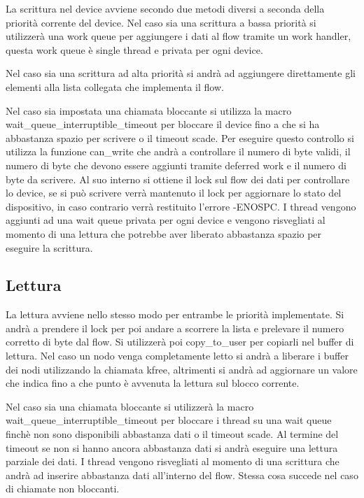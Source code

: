 \documentclass[a4paper,10pt]{article}
\begin{document}
La scrittura nel device avviene secondo due metodi diversi a seconda della priorità corrente del device.
Nel caso sia una scrittura a bassa priorità si utilizzerà una work queue per aggiungere i dati al flow tramite un work handler, questa work queue è single thread e privata per ogni device.

Nel caso sia una scrittura ad alta priorità si andrà ad aggiungere direttamente gli elementi alla lista collegata che implementa il flow.

Nel caso sia impostata una chiamata bloccante si utilizza la macro \\wait\_queue\_interruptible\_timeout per bloccare il device fino a che si ha abbastanza spazio per scrivere o il timeout scade. Per eseguire questo controllo si utilizza la funzione can\_write che andrà a controllare il numero di byte validi, il numero di byte che devono essere aggiunti tramite deferred work e il numero di byte da scrivere. Al suo interno si ottiene il lock sul flow dei dati per controllare lo device, se si può scrivere verrà mantenuto il lock per aggiornare lo stato del dispositivo, in caso contrario verrà restituito l'errore -ENOSPC. I thread vengono aggiunti ad una wait queue privata per ogni device e vengono risvegliati al momento di una lettura che potrebbe aver liberato abbastanza spazio per eseguire la scrittura.

\subsection{Lettura}
La lettura avviene nello stesso modo per entrambe le priorità implementate. Si andrà a prendere il lock per poi andare a scorrere la lista e prelevare il numero corretto di byte dal flow. Si utilizzerà poi copy\_to\_user per copiarli nel buffer di lettura. Nel caso un nodo venga completamente letto si andrà a liberare i buffer dei nodi utilizzando la chiamata kfree, altrimenti si andrà ad aggiornare un valore che indica fino a che punto è avvenuta la lettura sul blocco corrente.

Nel caso sia una chiamata bloccante si utilizzerà la macro \\wait\_queue\_interruptible\_timeout per bloccare i thread su una wait queue finchè non sono disponibili abbastanza dati o il timeout scade. Al termine del timeout se non si hanno ancora abbastanza dati si andrà eseguire una lettura parziale dei dati. I thread vengono risvegliati al momento di una scrittura che andrà ad inserire abbastanza dati all'interno del flow. Stessa cosa succede nel caso di chiamate non bloccanti.
\end{document}

